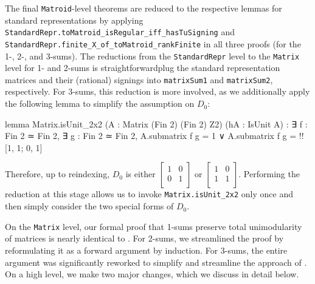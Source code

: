 The final \texttt{Matroid}-level theorems are reduced to the respective lemmas for standard representations by applying \texttt{StandardRepr.toMatroid\_isRegular\_iff\_hasTuSigning} and \texttt{StandardRepr.finite\_X\_of\_toMatroid\_rankFinite} in all three proofs (for the 1-, 2-, and 3-sums). The reductions from the \texttt{StandardRepr} level to the \texttt{Matrix} level for 1- and 2-sums is straightforward\EmDash plug the standard representation matrices and their (rational) signings into \texttt{matrixSum1} and \texttt{matrixSum2}, respectively. For 3-sums, this reduction is more involved, as we additionally apply the following lemma to simplify the assumption on $D_{0}$:
\begin{leancode}
lemma Matrix.isUnit_2x2
    (A : Matrix (Fin 2) (Fin 2) Z2)
    (hA : IsUnit A) :
  ∃ f : Fin 2 ≃ Fin 2,
  ∃ g : Fin 2 ≃ Fin 2,
    A.submatrix f g = 1 ∨
    A.submatrix f g = !![1, 1; 0, 1]
\end{leancode}
Therefore, up to reindexing, $D_{0}$ is either $\begin{bmatrix} 1 & 0 \\ 0 & 1 \\ \end{bmatrix}$ or $\begin{bmatrix} 1 & 0 \\ 1 & 1 \\ \end{bmatrix}$. Performing the reduction at this stage allows us to invoke \texttt{Matrix.isUnit\_2x2} only once and then simply consider the two special forms of $D_{0}$.

On the \texttt{Matrix} level, our formal proof that 1-sums preserve total unimodularity of matrices is nearly identical to \cite{Truemper2016}. For 2-sums, we streamlined the proof by reformulating it as a forward argument by induction. For 3-sums, the entire argument was significantly reworked to simplify and streamline the approach of \cite{Truemper2016}. On a high level, we make two major changes, which we discuss in detail below.

